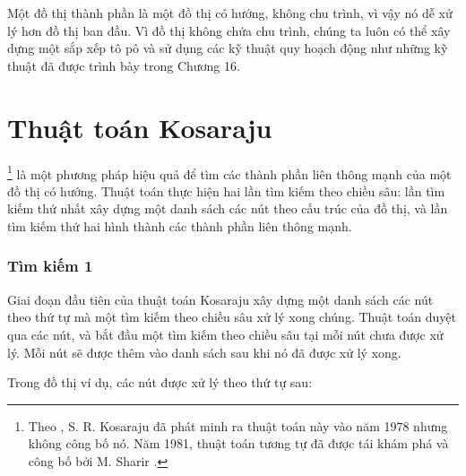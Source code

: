 Một đồ thị thành phần là một đồ thị có hướng, không chu trình,
vì vậy nó dễ xử lý hơn đồ thị ban đầu.
Vì đồ thị không chứa chu trình,
chúng ta luôn có thể xây dựng một sắp xếp tô pô và
sử dụng các kỹ thuật quy hoạch động như những kỹ thuật
đã được trình bày trong Chương 16.

\section{Thuật toán Kosaraju}


\footnote{Theo \cite{aho83},
S. R. Kosaraju đã phát minh ra thuật toán này vào năm 1978
nhưng không công bố nó. Năm 1981, thuật toán tương tự đã được tái khám phá
và công bố bởi M. Sharir \cite{sha81}.} là một phương pháp hiệu quả
để tìm các thành phần liên thông mạnh
của một đồ thị có hướng.
Thuật toán thực hiện hai lần tìm kiếm theo chiều sâu:
lần tìm kiếm thứ nhất xây dựng một danh sách các nút
theo cấu trúc của đồ thị,
và lần tìm kiếm thứ hai hình thành các thành phần liên thông mạnh.

\subsubsection{Tìm kiếm 1}

Giai đoạn đầu tiên của thuật toán Kosaraju xây dựng
một danh sách các nút theo thứ tự mà một
tìm kiếm theo chiều sâu xử lý xong chúng.
Thuật toán duyệt qua các nút,
và bắt đầu một tìm kiếm theo chiều sâu tại mỗi
nút chưa được xử lý.
Mỗi nút sẽ được thêm vào danh sách
sau khi nó đã được xử lý xong.

Trong đồ thị ví dụ, các nút được xử lý
theo thứ tự sau:
\begin{center}
\end{center}

